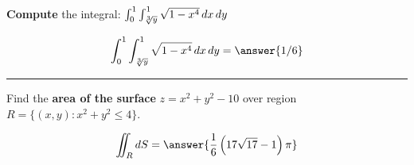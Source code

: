 \documentclass{ximera}
\begin{document}
\begin{problem}
  \textbf{Compute} the integral: $\int_0^1 \int_{\sqrt[3]{y}}^1 \sqrt{1-x^4}\mathop{}\!d x \mathop{}\!d y$
  \begin{prompt}
    \[
    \int_0^1 \int_{\sqrt[3]{y}}^1 \sqrt{1-x^4}\d x \d y = \answer{1/6}
    \]
  \end{prompt}
\end{problem}

\vfill

\hrule

\begin{problem}
  Find the \textbf{area of the surface} $z= x^2 + y^2 -10$ over region $R = \{(x,y):x^2+y^2\le 4 \}$.
  \begin{prompt}
    \[
    \iint_R \d S = \answer{\frac{1}{6} \left(17 \sqrt{17}-1\right) \pi}
    \]
  \end{prompt}  
\end{problem}
\vfill
\end{document}
